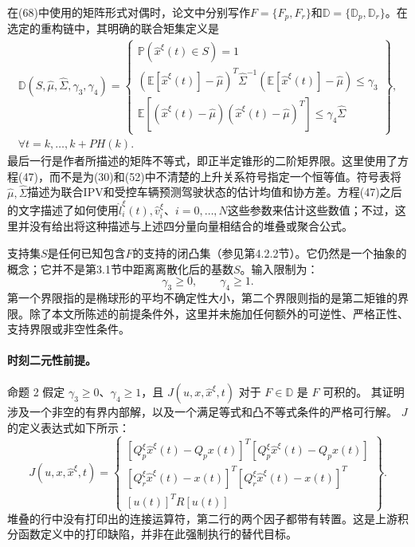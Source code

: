 \documentclass[10pt]{article}
\begin{document}
在(68)中使用的矩阵形式对偶时，论文中分别写作\(F=\{F_p,F_r\}\)和\(\mathbb D=\{\mathbb D_p,\mathbb D_r\}\)。在选定的重构链中，其明确的联合矩集定义是
\begin{equation}
\begin{gathered}
\mathbb D(S,\hat\mu,\hat\Sigma,\gamma_3,\gamma_4)=
\left\{\begin{array}{l}
\mathbb P(\hat x^\xi(t)\in S)=1\\
(\mathbb E[\hat x^\xi(t)]-\hat\mu)^T\hat\Sigma^{-1}
(\mathbb E[\hat x^\xi(t)]-\hat\mu)\leq\gamma_3\\
\mathbb E[(\hat x^\xi(t)-\hat\mu)(\hat x^\xi(t)-\hat\mu)^T]\leq\gamma_4\hat\Sigma
\end{array}\right\},\\
\forall t=k,\ldots,k+PH(k).
\end{gathered}
\tag{47}
\end{equation}
最后一行是作者所描述的矩阵不等式，即正半定锥形的二阶矩界限。这里使用了方程(47)，而不是为(30)和(52)中不清楚的上升关系符号指定一个恒等值。符号表将\(\hat\mu,\hat\Sigma\)描述为联合IPV和受控车辆预测驾驶状态的估计均值和协方差。方程(47)之后的文字描述了如何使用\(\hat l_i^\xi(t),\hat v_i^\xi\)、\(i=0,\ldots,N\)这些参数来估计这些数值；不过，这里并没有给出将这种描述与上述四分量向量相结合的堆叠或聚合公式。

支持集\(S\)是任何已知包含\(F\)的支持的闭凸集（参见第4.2.2节）。它仍然是一个抽象的概念；它并不是第3.1节中距离离散化后的基数\(S\)。输入限制为：
\[
\gamma_3\geq0,\qquad\gamma_4\geq1.
\]
第一个界限指的是椭球形的平均不确定性大小，第二个界限则指的是第二矩锥的界限。除了本文所陈述的前提条件外，这里并未施加任何额外的可逆性、严格正性、支持界限或非空性条件。

\paragraph{时刻二元性前提。}
命题 2 假定 \(\gamma_3\geq0\)、\(\gamma_4\geq1\)，且 \(J(u,x,\hat x^\xi,t)\) 对于 \(F\in\mathbb D\) 是 \(F\) 可积的。 其证明涉及一个非空的有界内部解，以及一个满足等式和凸不等式条件的严格可行解。 \(J\)的定义表达式如下所示：
\begin{equation}
J(u,x,\hat x^\xi,t)=
\left\{\begin{array}{l}
[Q_p^\xi\hat x^\xi(t)-Q_px(t)]^T[Q_p^\xi\hat x^\xi(t)-Q_px(t)]\\
{}[Q_r^\xi\hat x^\xi(t)-x(t)]^T[Q_r^\xi\hat x^\xi(t)-x(t)]^T\\
{}[u(t)]^TR[u(t)]
\end{array}\right\}.
\tag{48}
\end{equation}
堆叠的行中没有打印出的连接运算符，第二行的两个因子都带有转置。这是上游积分函数定义中的打印缺陷，并非在此强制执行的替代目标。
\end{document}
